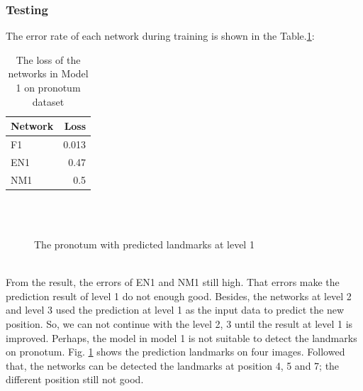 \documentclass[12pt,a4paper]{article}
\begin{document}
\subsubsection{Testing}
The error rate of each network during training is shown in the Table.\ref{model1p}:\\
\begin{table}[h!]
	\centering
	\begin{tabular}{l r}
	Network & Loss \\ \hline
	F1 & 0.013 \\ \hline
	EN1 & 0.47\\ \hline
	NM1 &  0.5
	\end{tabular}
	\caption{The loss of the networks in Model 1 on pronotum dataset}
	\label{model1p}
\end{table}
\begin{figure}[h!]
\centering
{}~~
\\
~~
\\
\caption{The pronotum with predicted landmarks at level 1}
\label{model1pTest}
\end{figure}\\
From the result, the errors of EN1 and NM1 still high. That errors make the prediction result of level 1 do not enough good. Besides, the networks at level 2 and level 3 used the prediction at level 1 as the input data to predict the new position. So, we can not continue with the level 2, 3 until the result at level 1 is improved. Perhaps, the model in model 1 is not suitable to detect the landmarks on pronotum.  Fig. \ref{model1pTest} shows the prediction landmarks on four images. Followed that, the networks can be detected the landmarks at position 4, 5 and 7; the different position still not good.
\end{document}
